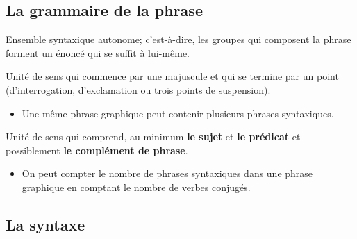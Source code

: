 \documentclass[10pt, french]{article}
\begin{document}
\raggedcolumns
\begin{multicols*}{2}

\section{La grammaire de la phrase}
\begin{definitionNOHFILL}
Ensemble syntaxique autonome; c'est-à-dire, les groupes qui composent la phrase forment un énoncé qui se suffit à lui-même.

\begin{definitionNOHFILLsub}
Unité de sens qui commence par une majuscule et qui se termine par un point (d'interrogation, d'exclamation ou trois points de suspension).
\begin{itemize}
	\item	Une même phrase graphique peut contenir plusieurs phrases syntaxiques.
\end{itemize}
\end{definitionNOHFILLsub}%
\begin{definitionNOHFILLsub}
Unité de sens qui comprend, au minimum \textbf{le sujet} et \textbf{le prédicat} et possiblement \textbf{le complément de phrase}.
\begin{itemize}
	\item	On peut compter le nombre de phrases syntaxiques dans une phrase graphique en comptant le nombre de verbes conjugés.
\end{itemize}
\end{definitionNOHFILLsub}
\end{definitionNOHFILL}

\subsection{La syntaxe}

\end{multicols*}
\end{document}

